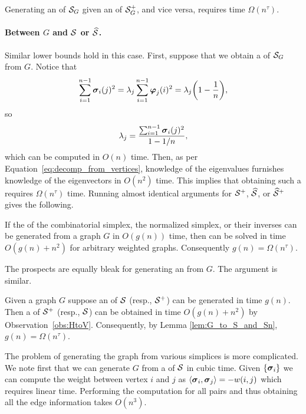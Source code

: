 \begin{lemma}
	\label{lem:hdesc_to_hdesc}
	Generating an \hdesc of $\mathcal{S}_G$ given an \hdesc of $\mathcal{S}_G^+$, and vice versa, requires time $\Omega(n^\tau)$. 
\end{lemma}


\paragraph{Between \texorpdfstring{$G$}{the graph} and \texorpdfstring{$\mathcal{S}$ or $\widehat{\mathcal{S}}$}{its simplices}.}
Similar lower  bounds  hold in this case. First, suppose that we obtain a \vdesc of $\mathcal{S}_G$ from $G$. Notice  that \[\sum_{i=1}^{n-1}   \vb*{\sigma}_i(j)^2 = \lambda_j \sum_{i=1}^{n-1} \vb*{\varphi}_j(i)^2 = \lambda_j\bigg(1-\frac{1}{n}\bigg),\]
so 
\[\lambda_j = \frac{\sum_{i=1}^{n-1}\vb*{\sigma}_i(j)^2}{1-1/n},\]
which can be computed  in $O(n)$  time. Then, as per Equation~\eqref{eq:decomp_from_vertices}, knowledge of the eigenvalues furnishes knowledge  of the eigenvectors in $O(n^2)$ time. This implies that obtaining such a \vdesc requires $\Omega(n^\tau)$ time. Running almost identical arguments for $\mathcal{S}^+$, $\widehat{\mathcal{S}}$, or $\widehat{\mathcal{S}}^+$ gives the  following. 

\begin{lemma}
	\label{lem:G_to_S_and_Sn}
	If the \vdesc of the combinatorial simplex, the normalized simplex, or their  inverses can be generated from a graph $G$ in $O(g(n))$ time, then \lapdecomp can be solved in time $O(g(n) + n^2)$ for arbitrary weighted graphs. Consequently $g(n) = \Omega(n^\tau)$. 
\end{lemma}

The prospects are  equally  bleak for generating an \hdesc from $G$. The argument is  similar. 

\begin{lemma}
	Given a graph $G$ suppose an \hdesc of $\mathcal{S}$ (resp., $\mathcal{S}^+$) can be generated in time $g(n)$. Then a \vdesc of $\mathcal{S}^+$ (resp., $\mathcal{S}$) can be obtained in time $O(g(n) + n^2)$ by Observation~\ref{obs:HtoV}. Consequently, by Lemma \ref{lem:G_to_S_and_Sn}, $g(n)=\Omega(n^\tau)$. 
\end{lemma}

The problem of generating the graph  from various simplices is more complicated. We note first that  we can  generate $G$ from a \vdesc of $\mathcal{S}$ in  cubic time. Given $\{\vb*{\sigma}_i\}$ we can compute the weight between vertex $i$ and  $j$ as  $\langle \vb*{\sigma}_i,\vb*{\sigma}_j\rangle=-w(i,j)$ which  requires linear time. Performing the computation for all pairs and thus obtaining all the edge information takes $O(n^3)$. 

